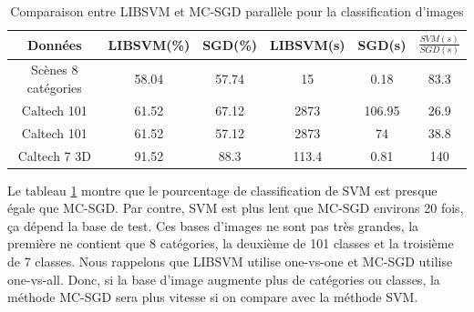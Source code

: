 \begin{table}[h]
\begin{center}
    \begin{tabular}{ | c | c | c | c | c | c |}
    \hline
    Données & LIBSVM(\%) & SGD(\%) & LIBSVM(s) & SGD(s) & $\frac{SVM(s)}{SGD(s)}$ \\ \hline
    
    Scènes 8 catégories & 58.04 & 57.74 & 15 & 0.18 & 83.3 \\ \hline
    
    Caltech 101 & 61.52 & 67.12 & 2873 & 106.95 & 26.9 \\ \hline    
    
    Caltech 101 & 61.52 & 57.12 & 2873 & 74 & 38.8 \\ \hline   
    
    Caltech 7 3D & 91.52 & 88.3 & 113.4 & 0.81 & 140 \\ \hline    
    
    \end{tabular}
\end{center}
\caption{Comparaison entre LIBSVM et MC-SGD parallèle pour la classification d'images}
\label{tab:pmcsvm-8scenes}
\end{table}

Le tableau \ref{tab:pmcsvm-8scenes} montre que le pourcentage de classification de SVM est presque égale que MC-SGD. Par contre, SVM est plus lent que MC-SGD environs 20 fois, ça dépend la base de test. Ces bases d'images ne sont pas très grandes, la première ne contient que 8 catégories, la deuxième de 101 classes et la troisième de 7 classes. Nous rappelons que LIBSVM utilise one-vs-one et MC-SGD utilise one-vs-all. Donc, si la base d'image augmente plus de catégories ou classes, la méthode MC-SGD sera plus vitesse si on compare avec la méthode SVM.



